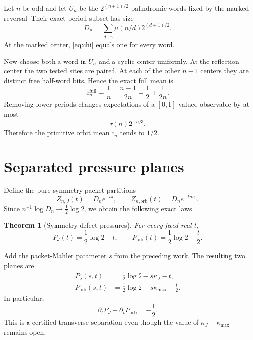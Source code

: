 \documentclass[11pt]{article}
\newtheorem{theorem}{Theorem}[section]
\begin{document}
Let $n$ be odd and let $U_n$ be the $2^{(n+1)/2}$ palindromic words fixed by
the marked reversal.  Their exact-period subset has size
\begin{equation}\label{eq:Dn}
 D_n=\sum_{d\mid n}\mu(n/d)2^{(d+1)/2}.
\end{equation}
At the marked center, \eqref{eq:chi} equals one for every word.

Now choose both a word in $U_n$ and a cyclic center uniformly.  At the
reflection center the two tested sites are paired.  At each of the other
$n-1$ centers they are distinct free half-word bits.  Hence the exact full
mean is
\begin{equation}\label{eq:fullmean}
 c_n^{\mathrm{full}}=\frac1n+\frac{n-1}{2n}
 =\frac12+\frac1{2n}.
\end{equation}
Removing lower periods changes expectations of a $[0,1]$-valued observable
by at most
\begin{equation}\label{eq:primitive-error}
 \tau(n)2^{-n/3}.
\end{equation}
Therefore the primitive orbit mean $c_n$ tends to $1/2$.

\section{Separated pressure planes}

Define the pure symmetry packet partitions
\begin{equation}\label{eq:partitions}
 Z_{n,J}(t)=D_ne^{-tn},
 \qquad
 Z_{n,\mathrm{orb}}(t)=D_ne^{-tnc_n}.
\end{equation}
Since $n^{-1}\log D_n\to\frac12\log2$, we obtain the following exact laws.

\begin{theorem}[Symmetry-defect pressures]\label{thm:pressure}
For every fixed real $t$,
\begin{equation}\label{eq:pressures}
 P_J(t)=\frac12\log2-t,
 \qquad
 P_{\mathrm{orb}}(t)=\frac12\log2-\frac t2.
\end{equation}
\end{theorem}

Add the packet-Mahler parameter $s$ from the preceding work.  The resulting
two planes are
\begin{align}\label{eq:planes}
 P_J(s,t)&=\frac12\log2-s\kappa_J-t,\\
 P_{\mathrm{orb}}(s,t)&=\frac12\log2-s\kappa_{\max}-\frac t2.
\end{align}
In particular,
\begin{equation}\label{eq:gradient}
 \partial_tP_J-\partial_tP_{\mathrm{orb}}=-\frac12.
\end{equation}
This is a certified transverse separation even though the value of
$\kappa_J-\kappa_{\max}$ remains open.
\end{document}
